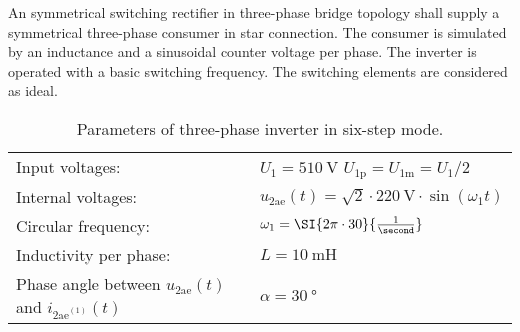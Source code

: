 

 



\newpage



An symmetrical switching rectifier in three-phase bridge topology shall supply a
symmetrical three-phase consumer in star connection. The consumer is simulated by an inductance and 
a sinusoidal counter voltage per phase. The inverter is operated with a basic switching frequency.
The switching elements are considered as ideal.

% 


\begin{table}[ht]
    \centering  %
    \begin{tabular}{ll}
        \toprule
        Input voltages: & $U_\mathrm{1}=\SI{510}{\volt}$ \quad $U_\mathrm{1p}=U_\mathrm{1m}=U_\mathrm{1}/2$ \\
        Internal voltages: & $u_{\mathrm{2ae}}(t) = \sqrt{2} \cdot \SI{220}{\volt} \cdot \sin(\omega_1t)$ \\
        Circular frequency: & $\omega_1 = \SI{2 \pi \cdot 30}{\frac{1}{\second}}$ \\ 
        Inductivity per phase: & $L= \SI{10}{\milli \henry}$ \\
        Phase angle between  $u_{\mathrm{2ae}}(t)$ and $i_{\mathrm{2ae}^\mathrm{(1)}}(t)$ & $\alpha=\SI{30}{\degree}$ \\
        \bottomrule
    \end{tabular}
    \caption{Parameters of three-phase inverter in six-step mode.}  
    \label{table:ex07_Task2_ParametersOfTheCircuit}
\end{table}



